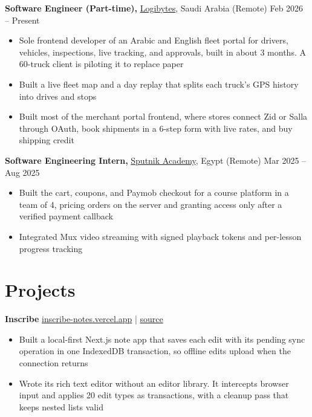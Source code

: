 \documentclass[11pt]{article}       %
\begin{document}
\textbf{Software Engineer (Part-time),} \href{https://logibytes.sa/en/}{Logibytes}, Saudi Arabia (Remote) \hfill Feb 2026 -- Present \\
\vspace{-9pt}
\begin{itemize}
    \item Sole frontend developer of an Arabic and English fleet portal for drivers, vehicles, inspections, live tracking, and approvals, built in about 3 months. A 60-truck client is piloting it to replace paper
    \item Built a live fleet map and a day replay that splits each truck's GPS history into drives and stops
    \item Built most of the merchant portal frontend, where stores connect Zid or Salla through OAuth, book shipments in a 6-step form with live rates, and buy shipping credit
\end{itemize}

\textbf{Software Engineering Intern,} \href{https://www.linkedin.com/company/sputnik-academy/}{Sputnik Academy}, Egypt (Remote) \hfill Mar 2025 -- Aug 2025 \\
\vspace{-9pt}
\begin{itemize}
    \item Built the cart, coupons, and Paymob checkout for a course platform in a team of 4, pricing orders on the server and granting access only after a verified payment callback
    \item Integrated Mux video streaming with signed playback tokens and per-lesson progress tracking
\end{itemize}

\vspace{-18.5pt}
\section*{Projects}
\textbf{Inscribe} \hfill \href{https://inscribe-notes.vercel.app/}{inscribe-notes.vercel.app} | \href{https://github.com/MahmoudOmiesh/Inscribe}{source} \\
\vspace{-9pt}
\begin{itemize}
    \item Built a local-first Next.js note app that saves each edit with its pending sync operation in one IndexedDB transaction, so offline edits upload when the connection returns
    \item Wrote its rich text editor without an editor library. It intercepts browser input and applies 20 edit types as transactions, with a cleanup pass that keeps nested lists valid
\end{itemize}
\end{document}
